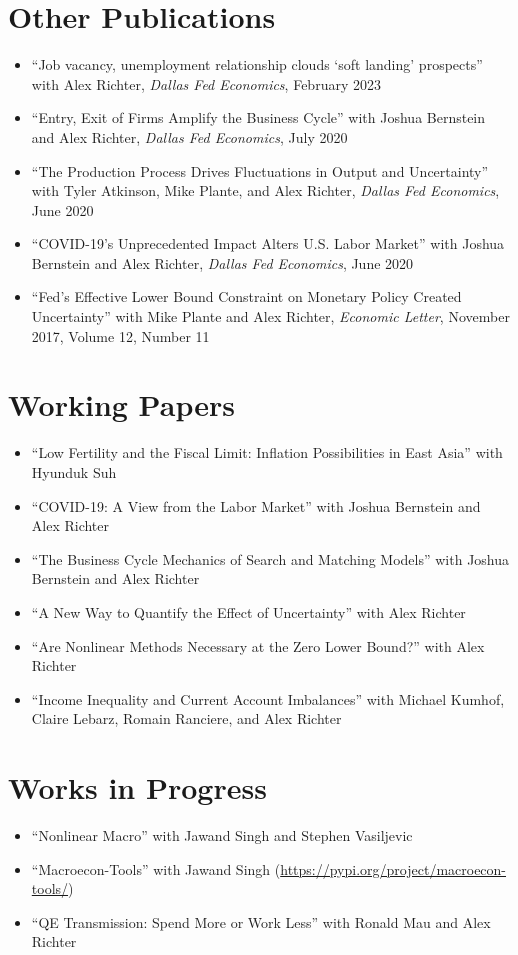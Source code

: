 \documentclass[10pt,letterpaper,en-US]{article}
\begin{document}
\section*{Other Publications}
\begin{itemize}
\item ``Job vacancy, unemployment relationship clouds ‘soft landing’ prospects'' with Alex Richter, \emph{Dallas Fed Economics}, February 2023
\item ``Entry, Exit of Firms Amplify the Business Cycle'' with Joshua Bernstein and Alex Richter, \emph{Dallas Fed Economics}, July 2020
\item ``The Production Process Drives Fluctuations in Output and Uncertainty'' with Tyler Atkinson, Mike Plante, and Alex Richter, \emph{Dallas Fed Economics}, June 2020
\item ``COVID-19’s Unprecedented Impact Alters U.S. Labor Market'' with Joshua Bernstein and Alex Richter, \emph{Dallas Fed Economics}, June 2020
\item ``Fed's Effective Lower Bound Constraint on Monetary Policy Created Uncertainty'' with Mike Plante and Alex Richter, \emph{Economic Letter}, November 2017, Volume 12, Number 11
\end{itemize}

\section*{Working Papers}
\begin{itemize}
\item ``Low Fertility and the Fiscal Limit: Inflation Possibilities in East Asia'' with Hyunduk Suh
\item ``COVID-19: A View from the Labor Market'' with Joshua Bernstein and Alex Richter
\item ``The Business Cycle Mechanics of Search and Matching Models'' with Joshua Bernstein and Alex Richter
\item ``A New Way to Quantify the Effect of Uncertainty'' with Alex Richter
\item ``Are Nonlinear Methods Necessary at the Zero Lower Bound?'' with Alex Richter
\item ``Income Inequality and Current Account Imbalances'' with Michael Kumhof, Claire Lebarz, Romain Ranciere, and Alex Richter
\end{itemize}

\section*{Works in Progress}
\begin{itemize}
\item ``Nonlinear Macro'' with Jawand Singh and Stephen Vasiljevic
\item ``Macroecon-Tools'' with Jawand Singh (\href{https://pypi.org/project/macroecon-tools/}{https://pypi.org/project/macroecon-tools/})
\item ``QE Transmission: Spend More or Work Less'' with Ronald Mau and Alex Richter
\end{itemize}
\end{document}
